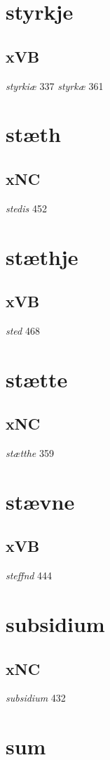 \documentclass[a4paper,twocolumn]{article}
\begin{document}
\section{styrkje}
\label{sec:org0d3ebea}
\subsection{xVB}
\label{sec:org6e980de}
\emph{styrkiæ} 337 \emph{styrkæ} 361 
\section{stæth}
\label{sec:orgcfba76f}
\subsection{xNC}
\label{sec:orga193124}
\emph{stedis} 452 
\section{stæthje}
\label{sec:org7f4389b}
\subsection{xVB}
\label{sec:orgac45a35}
\emph{sted} 468 
\section{stætte}
\label{sec:org88cb4d5}
\subsection{xNC}
\label{sec:org5f7ded6}
\emph{stætthe} 359 
\section{stævne}
\label{sec:orge4b741c}
\subsection{xVB}
\label{sec:orga7c5f42}
\emph{steffnd} 444 
\section{subsidium}
\label{sec:org9343e4f}
\subsection{xNC}
\label{sec:org1f316aa}
\emph{subsidium} 432 
\section{sum}
\label{sec:org14f421c}
\end{document}
